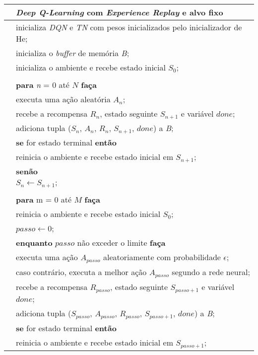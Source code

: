 \begin{tabular}{l l}

\hline
 & \textit{Deep Q-Learning} com \textit{Experience Replay} e alvo fixo\\
\hline

 & inicializa \textit{DQN} e \textit{TN} com pesos inicializados pelo inicializador de He;\\
 & inicializa o \textit{buffer} de memória \textit{B};\\
 & inicializa o ambiente e recebe estado inicial $S_{0}$;\\
\\
 & \textbf{para} \textit{n} = 0 até $N$ \textbf{faça}\\
 & \qquad executa uma ação aleatória $A_{n}$;\\
 & \qquad recebe a recompensa $R_{n}$, estado seguinte $S_{n+1}$ e variável $done$;\\
 & \qquad adiciona tupla ($S_{n}$, $A_{n}$, $R_{n}$, $S_{n+1}$, $done$) a \textit{B};\\
 & \qquad \textbf{se} for estado terminal \textbf{então}\\
 & \qquad \qquad reinicia o ambiente e recebe estado inicial em $S_{n+1}$;\\
 & \qquad \textbf{senão}\\
 & \qquad \qquad $S_{n} \leftarrow S_{n+1};$ \\
\\
 & \textbf{para} m = 0 até $M$ \textbf{faça}\\
 & \qquad reinicia o ambiente e recebe estado inicial $S_{0}$;\\
 & \qquad $passo \leftarrow 0$;\\
 & \qquad \textbf{enquanto} $passo$ não exceder o limite \textbf{faça}\\
 & \qquad \qquad executa uma ação $A_{passo}$ aleatoriamente com probabilidade $\epsilon$;\\
 & \qquad \qquad caso contrário, executa a melhor ação $A_{passo}$ segundo a rede neural;\\
 & \qquad \qquad recebe a recompensa $R_{passo}$, estado seguinte $S_{passo+1}$ e variável $done$;\\
 & \qquad \qquad adiciona tupla ($S_{passo}$, $A_{passo}$, $R_{passo}$, $S_{passo+1}$, $done$) a \textit{B};\\
 & \qquad \qquad \textbf{se} for estado terminal \textbf{então}\\
 & \qquad \qquad \qquad reinicia o ambiente e recebe estado inicial em $S_{passo+1}$;\\

\end{tabular}
